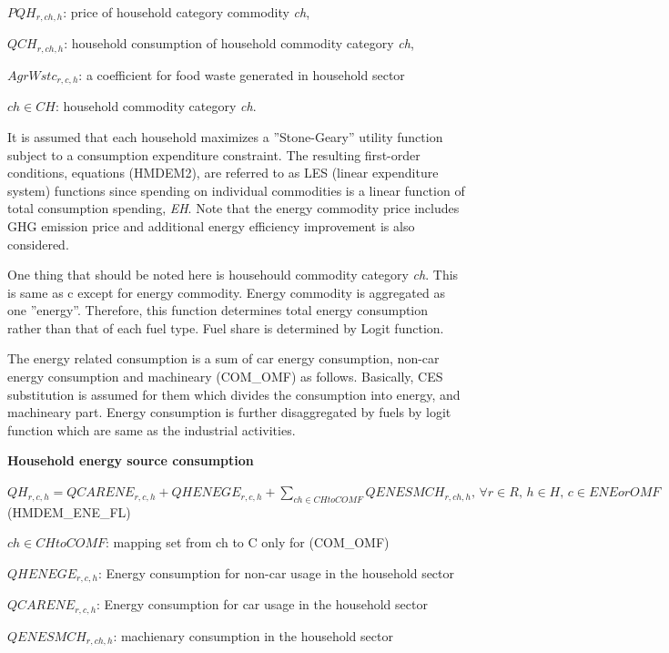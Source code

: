\documentclass[10pt,a4paper,titlepage,dvipdfmx]{book}
\begin{document}
\begin{flushleft}
$PQH_{r,ch,h}$:
 price of household category commodity \textit{ch},

$QCH_{r,ch,h}$:
 household consumption of household commodity category \textit{ch},

$AgrWstc_{r,c,h}$: a coefficient for food waste generated in household sector

$ch\in CH$: household commodity category \textit{ch}.
\end{flushleft}

It is assumed that each household maximizes a ''Stone-Geary'' utility function subject to a consumption expenditure constraint. The resulting first-order conditions, equations (HMDEM2), are referred to as LES (linear expenditure system) functions since spending on individual commodities is a linear function of total consumption spending, \textit{EH}. Note that the energy commodity price includes GHG emission price and additional energy efficiency improvement is also considered.

One thing that should be noted here is househould commodity category \textit{ch}. This is same as c except for energy commodity. Energy commodity is aggregated as one ''energy''. Therefore, this function determines total energy consumption rather than that of each fuel type. Fuel share is determined by Logit function.

The energy related consumption is a sum of car energy consumption, non-car energy consumption and machineary (COM\_OMF) as follows. Basically, CES substitution is assumed for them which divides the consumption into energy, and machineary part. Energy consumption is further disaggregated by fuels by logit function which are same as the industrial activities.

\begin{flushleft}\textbf{Household energy source consumption }\end{flushleft}


\begin{center}$QH_{r,c,h}=QCARENE_{r,c,h}+QHENEGE_{r,c,h}+\sum _{ch\in CHtoCOMF}QENESMCH_{r,ch,h},\,\forall r\in R,\,h\in H,\,c\in ENE or OMF\,\,$ (HMDEM\_ENE\_FL)
\end{center}

\begin{flushleft}
$ch\in CHtoCOMF$: mapping set from ch to C only for (COM\_OMF)

$QHENEGE_{r,c,h}$: Energy consumption for non-car usage in the household sector

$QCARENE_{r,c,h}$: Energy consumption for car usage in the household sector

$QENESMCH_{r,ch,h}$: machienary consumption in the household sector 
\end{flushleft}
\end{document}
